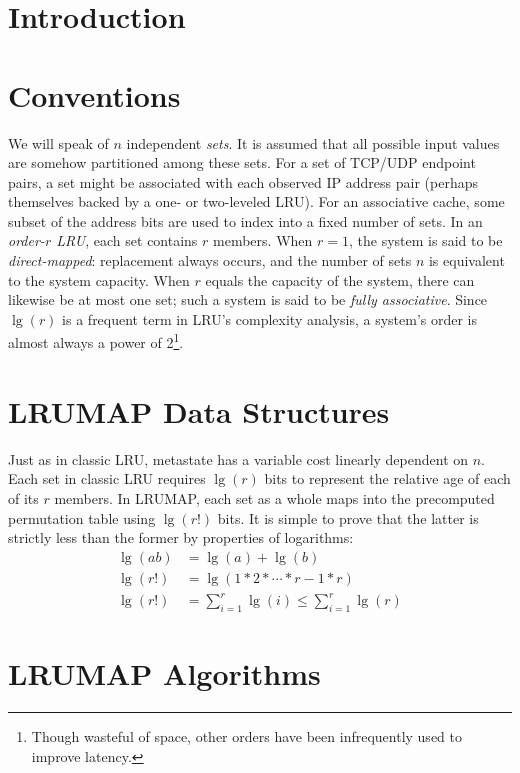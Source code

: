 \documentclass[letterpaper,10pt]{article}
\begin{document}
\begin{multicols}{2}
\section{Introduction}
\cite{varghese}
\cite{xu}

\section{Conventions}
We will speak of $n$ independent \textit{sets}. It is assumed that all possible
input values are somehow partitioned among these sets. For a set of TCP/UDP
endpoint pairs, a set might be associated with each observed IP address pair
(perhaps themselves backed by a one- or two-leveled LRU). For an associative
cache, some subset of the address bits are used to index into a fixed number of
sets. In an \textit{order-$r$ LRU}, each set contains $r$ members. When $r=1$,
the system is said to be \textit{direct-mapped}: replacement always occurs, and
the number of sets $n$ is equivalent to the system capacity. When $r$ equals
the capacity of the system, there can likewise be at most one set; such a system
is said to be \textit{fully associative}. Since $\lg{(r)}$ is a frequent term in
LRU's complexity analysis, a system's order is almost always a power of 2\footnote{Though
wasteful of space, other orders have been infrequently used to improve latency\cite{intelcpuid}.}.
\section{LRUMAP Data Structures}
Just as in classic LRU, metastate has a variable cost linearly dependent on $n$.
Each set in classic LRU requires $\lg{(r)}$ bits to represent the relative age
of each of its $r$ members. In LRUMAP, each set as a whole maps into the
precomputed permutation table using $\lg{(r!)}$ bits. It is simple to prove that
the latter is strictly less than the former by properties of logarithms:
\begin{align*}
\lg{(ab)} &= \lg{(a)} + \lg{(b)} \\
\lg{(r!)} &= \lg{(1*2*\dotsb*r-1*r)} \\
\lg{(r!)} &= \sum_{i=1}^{r}{\lg{(i)}} \le \sum_{i=1}^{r}{\lg{(r)}}
\end{align*}
\section{LRUMAP Algorithms}

\end{multicols}
\end{document}
